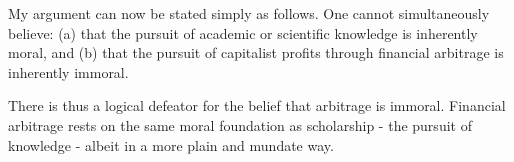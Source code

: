 \documentclass[11pt,]{article}
\begin{document}
My argument can now be stated simply as follows. One cannot
simultaneously believe: (a) that the pursuit of academic or scientific
knowledge is inherently moral, and (b) that the pursuit of capitalist
profits through financial arbitrage is inherently immoral.

There is thus a logical defeator for the belief that arbitrage is
immoral. Financial arbitrage rests on the same moral foundation as
scholarship - the pursuit of knowledge - albeit in a more plain and
mundate way.

\newpage
\singlespacing 

\end{document}
